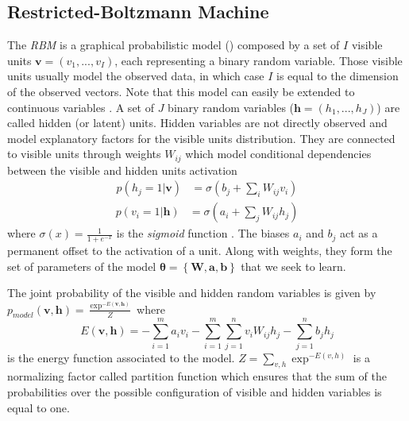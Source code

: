 \documentclass{article}
\begin{document}
\subsection{Restricted-Boltzmann Machine}
The \textit{RBM} \cite{hinton2006fast} is a graphical probabilistic model () composed by a set of $I$ visible units $\bm{v} = (v_{1},...,v_{I})$, each representing a binary random variable. Those visible units usually model the observed data, in which case $I$ is equal to the dimension of the observed vectors. Note that this model can easily be extended to continuous variables \cite{hinton2010practical}. A set of $J$ binary random variables ($\bm{h} = (h_{1},...,h_{J})$) are called hidden (or latent) units. Hidden variables are not directly observed and model explanatory factors for the visible units distribution. They are connected to visible units through weights $W_{ij}$ which model conditional dependencies between the visible and hidden units activation
\begin{align}
\label{eq:marginal_RBM_1}
p(h_{j}=1|\bm{v}) &= \sigma \left( b_{j} + \sum_{i}W_{ij}v_{i} \right)
\end{align}
\begin{align}
\label{eq:marginal_RBM_2}
p(v_{i}=1|\bm{h}) &= \sigma \left( a_{i} + \sum_{j}W_{ij}h_{j} \right)
\end{align}
where $\sigma	(x) = \frac{1}{1+e^{-x}}$ is the \textit{sigmoid} function . The biases $a_{i}$ and $b_{j}$ act as a permanent offset to the activation of a unit. Along with weights, they form the set of parameters of the model $\bm{\theta} = \left\lbrace \bm{W} , \bm{a} , \bm{b} \right\rbrace$ that we seek to learn.

The joint probability of the visible and hidden random variables is given by $p_{model}(\bm{v},\bm{h}) = \frac{\exp^{-E(\bm{v},\bm{h})}}{Z}$ where
\begin{equation}
\label{eq:energy}
E(\bm{v},\bm{h}) = - \sum_{i=1}^{m} a_{i} v_{i}  - \sum_{i=1}^{m} \sum_{j=1}^{n} v_{i} W_{ij} h_{j} - \sum_{j = 1}^{n} b_{j} h_{j}
\end{equation}
is the energy function associated to the model. $Z = \sum_{v,h}\exp^{-E(v,h)}$ is a normalizing factor called partition function which ensures that the sum of the probabilities over the possible configuration of visible and hidden variables is equal to one.
\end{document}
